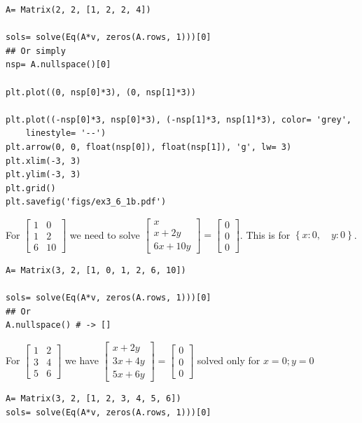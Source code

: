 \begin{verbatim}
A= Matrix(2, 2, [1, 2, 2, 4])

sols= solve(Eq(A*v, zeros(A.rows, 1)))[0]
## Or simply
nsp= A.nullspace()[0]

plt.plot((0, nsp[0]*3), (0, nsp[1]*3))

plt.plot((-nsp[0]*3, nsp[0]*3), (-nsp[1]*3, nsp[1]*3), color= 'grey',
    linestyle= '--')
plt.arrow(0, 0, float(nsp[0]), float(nsp[1]), 'g', lw= 3)
plt.xlim(-3, 3)
plt.ylim(-3, 3)
plt.grid()
plt.savefig('figs/ex3_6_1b.pdf')
\end{verbatim}

For $\left[\begin{matrix}1 & 0\\1 & 2\\6 & 10\end{matrix}\right]$ we need to solve
$\left[\begin{matrix}x\\x + 2 y\\6 x + 10 y\end{matrix}\right] = \left[\begin{matrix}0\\0\\0\end{matrix}\right]$.
This is for $\left \{ x : 0, \quad y : 0\right \}$.

\begin{verbatim}
A= Matrix(3, 2, [1, 0, 1, 2, 6, 10])

sols= solve(Eq(A*v, zeros(A.rows, 1)))[0]
## Or
A.nullspace() # -> []
\end{verbatim}


For $\left[\begin{matrix}1 & 2\\3 & 4\\5 & 6\end{matrix}\right]$ we have
$\left[\begin{matrix}x + 2 y\\3 x + 4 y\\5 x + 6 y\end{matrix}\right] = \left[\begin{matrix}0\\0\\0\end{matrix}\right]$
solved only for $x= 0; y= 0$

\begin{verbatim}
A= Matrix(3, 2, [1, 2, 3, 4, 5, 6])
sols= solve(Eq(A*v, zeros(A.rows, 1)))[0]
\end{verbatim}

